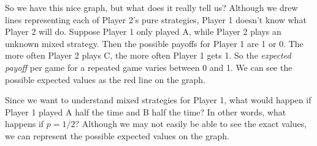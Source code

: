 So we have this nice graph, but what does it really tell us? Although we drew lines representing each of Player 2's pure strategies, Player 1 doesn't know what Player 2 will do. Suppose Player 1 only played A, while Player 2 plays an unknown mixed strategy. Then the possible payoffs for Player 1 are 1 or 0. The more often Player 2 plays C, the more often Player 1 gets 1. So the {\it expected payoff} per game for a repeated game varies between 0 and 1. We can see the possible expected values as the red line on the graph.

\break

\begin{figure}
\begin{center}
   \label{BoldA}
\end{center}   
\end{figure}

Since we want to understand mixed strategies for Player 1, what would happen if Player 1 played A half the time and B half the time? In other words, what happens if $p=1/2$? Although we may not easily be able to see the exact values, we can represent the possible expected values on the graph. 


